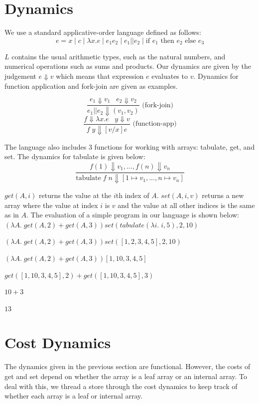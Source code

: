 \documentclass[preprint]{sigplanconf}
\begin{document}
\section{Dynamics}

We use a standard applicative-order language defined as follows:
$$e = x \; | \; c  \; | \; \lambda x.e \; | \; e_1 e_2 \; | \; e_1 || e_2 \; | \; \text{if } e_1 \text{ then } e_2 \text{ else } e_3$$

$L$ contains the usual arithmetic types, such as the natural numbers, and numerical operations such as sums and products. Our dynamics are given by the judgement $e \Downarrow v$ which means that expression $e$ evaluates to $v$. Dynamics for function application and fork-join are given as examples.

$$\frac{e_1 \Downarrow v_1 \;\;\; e_2 \Downarrow v_2}{e_1 || e_2 \Downarrow (v_1, v_2)} \text{ (fork-join)}$$
$$\frac{f \Downarrow \lambda x . e \;\;\; y \Downarrow v}{f \; y \Downarrow [v/x]e} \text{ (function-app)}$$

The language also includes 3 functions for working with arrays: tabulate, get, and set. The dynamics for tabulate is given below:
$$\frac{f(1) \Downarrow v_1, ..., f(n) \Downarrow v_n}{\text{tabulate} \; f \; n \Downarrow [1 \mapsto v_1, ..., n \mapsto v_n]}$$

$get(A,i)$ returns the value at the $i$th index of $A$. $set(A,i,v)$ returns a new array where the value at index $i$ is $v$ and the value at all other indices is the same as in $A$. The evaluation of a simple program in our language is shown below:\\

$(\lambda A. \; get(A, 2) + get(A,3)) set(tabulate(\lambda i . \; i, 5), 2, 10)$

$(\lambda A. \; get(A, 2) + get(A,3)) set([1,2,3,4,5], 2, 10)$

$(\lambda A. \; get(A, 2) + get(A,3)) [1,10,3,4,5]$

$get([1,10,3,4,5], 2) + get([1,10,3,4,5],3) $

$10+3$

$13$

\section{Cost Dynamics}

The dynamics given in the previous section are functional. However, the costs of get and set depend on whether the array is a leaf array or an internal array. To deal with this, we thread a store through the cost dynamics to keep track of whether each array is a leaf or internal array.
\end{document}
